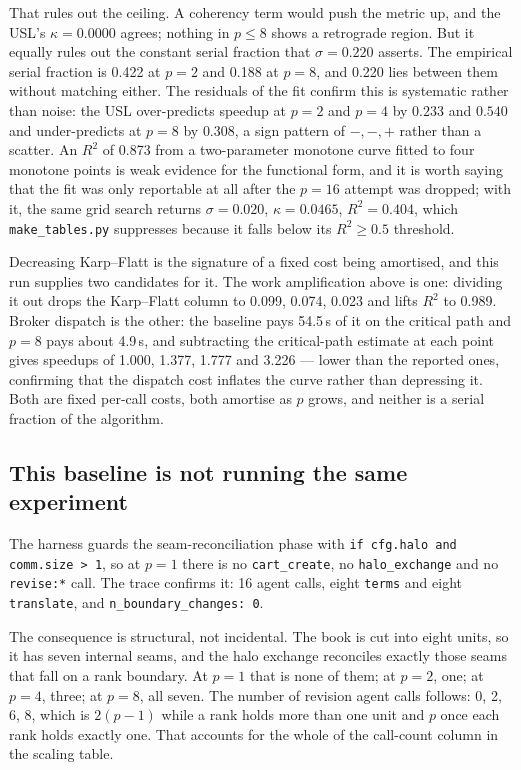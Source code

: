 \documentclass[11pt]{article}
\begin{document}
That rules out the ceiling. A coherency term would push the metric up, and the USL's
$\kappa=0.0000$ agrees; nothing in $p\le8$ shows a retrograde region. But it equally rules out the
constant serial fraction that $\sigma=0.220$ asserts. The empirical serial fraction is 0.422 at
$p=2$ and 0.188 at $p=8$, and 0.220 lies between them without matching either. The residuals of
the fit confirm this is systematic rather than noise: the USL over-predicts speedup at $p=2$ and
$p=4$ by $0.233$ and $0.540$ and under-predicts at $p=8$ by $0.308$, a sign pattern of
$-,-,+$ rather than a scatter. An $R^2$ of 0.873 from a two-parameter monotone curve fitted to
four monotone points is weak evidence for the functional form, and it is worth saying that the
fit was only reportable at all after the $p=16$ attempt was dropped; with it, the same grid search
returns $\sigma=0.020$, $\kappa=0.0465$, $R^2=0.404$, which \texttt{make\_tables.py} suppresses
because it falls below its $R^2\ge0.5$ threshold.

Decreasing Karp--Flatt is the signature of a fixed cost being amortised, and this run supplies two
candidates for it. The work amplification above is one: dividing it out drops the Karp--Flatt
column to 0.099, 0.074, 0.023 and lifts $R^2$ to 0.989. Broker dispatch is the other: the baseline
pays 54.5\,s of it on the critical path and $p=8$ pays about 4.9\,s, and subtracting the
critical-path estimate at each point gives speedups of 1.000, 1.377, 1.777 and 3.226 --- lower
than the reported ones, confirming that the dispatch cost inflates the curve rather than
depressing it. Both are fixed per-call costs, both amortise as $p$ grows, and neither is a serial
fraction of the algorithm.

\subsection*{This baseline is not running the same experiment}

The harness guards the seam-reconciliation phase with \texttt{if cfg.halo and comm.size > 1}, so
at $p=1$ there is no \texttt{cart\_create}, no \texttt{halo\_exchange} and no \texttt{revise:*}
call. The trace confirms it: 16 agent calls, eight \texttt{terms} and eight \texttt{translate},
and \texttt{n\_boundary\_changes: 0}.

The consequence is structural, not incidental. The book is cut into eight units, so it has seven
internal seams, and the halo exchange reconciles exactly those seams that fall on a rank boundary.
At $p=1$ that is none of them; at $p=2$, one; at $p=4$, three; at $p=8$, all seven. The number of
revision agent calls follows: 0, 2, 6, 8, which is $2(p-1)$ while a rank holds more than one unit
and $p$ once each rank holds exactly one. That accounts for the whole of the call-count column in
the scaling table.
\end{document}
